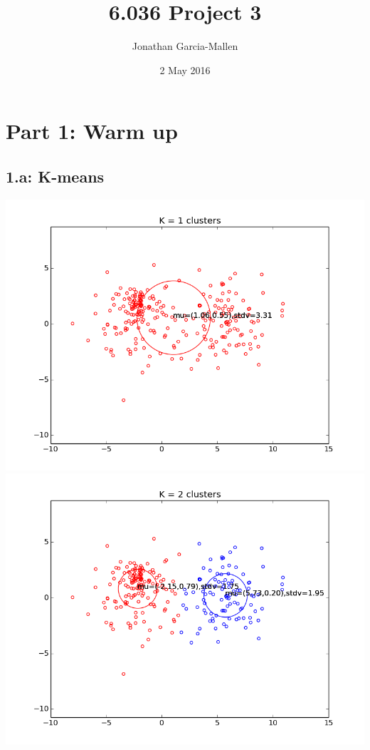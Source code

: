 \documentclass{article}
\title{6.036 Project 3}
\author{Jonathan Garcia-Mallen}
\date{2 May 2016}
\begin{document}
\maketitle


\section*{ Part 1: Warm up}
\subsection*{1.a: K-means}
    
    \begin{center}
      \includegraphics[scale=0.4]{sec1a_k1.png}
      \includegraphics[scale=0.4]{sec1a_k2.png} 

\end{center}
\end{document}

